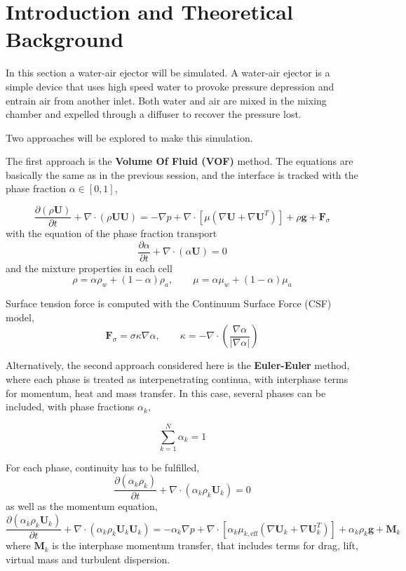\documentclass[
    parskip=half,      %
    DIV=12,            %
    headings=normal,   %
    fontsize=11pt,     %
    english            %
]{scrartcl}
\begin{document}
\section{Introduction and Theoretical Background}

In this section a water-air ejector will be simulated. A water-air ejector is a simple 
device that uses high speed water to provoke  pressure depression and entrain air from 
another inlet. Both water and air are mixed in the mixing chamber and expelled through a 
diffuser to recover the pressure lost.

Two approaches will be explored to make this simulation. 

The first approach is the \textbf{Volume Of Fluid (VOF)} method. The equations are basically the same
as in the previous session, and the interface is tracked with the phase fraction 
$\alpha \in [0,1]$,

\begin{equation}
\frac{\partial (\rho \mathbf{U})}{\partial t} + \nabla \cdot (\rho \mathbf{U} \mathbf{U}) = 
-\nabla p + \nabla \cdot \left[ \mu \left( \nabla \mathbf{U} + \nabla \mathbf{U}^T \right) \right] + \rho \mathbf{g} + \mathbf{F}_\sigma
\end{equation}  
with the equation of the phase fraction transport
\[
\frac{\partial \alpha}{\partial t} + \nabla \cdot (\alpha \mathbf{U}) = 0
\]
and the mixture properties in each cell
\[
\rho = \alpha \rho_w + (1-\alpha) \rho_a, \qquad 
\mu = \alpha \mu_w + (1-\alpha) \mu_a
\]

Surface tension force is computed with the Continuum Surface Force (CSF) model,
\[
\mathbf{F}_\sigma = \sigma \kappa \nabla \alpha, \qquad 
\kappa = -\nabla \cdot \left( \frac{\nabla \alpha}{|\nabla \alpha|} \right)
\]

Alternatively, the second approach considered here is the \textbf{Euler-Euler} method, where each phase 
is treated as interpenetrating continua, with interphase terms for momentum, heat and mass 
transfer. In this case, several phases can be included, with phase fractions $\alpha_k$, 

\[
\sum_{k=1}^{N} \alpha_k = 1
\]

For each phase, continuity has to be fulfilled,
\begin{equation}
	\frac{\partial (\alpha_k \rho_k)}{\partial t} + \nabla \cdot (\alpha_k \rho_k \mathbf{U}_k) = 0
\end{equation}
as well as the momentum equation,
\begin{equation}
\frac{\partial (\alpha_k \rho_k \mathbf{U}_k)}{\partial t} + \nabla \cdot (\alpha_k \rho_k \mathbf{U}_k \mathbf{U}_k) = 
-\alpha_k \nabla p + \nabla \cdot \left[ \alpha_k \mu_{k,\text{eff}} \left( \nabla \mathbf{U}_k + \nabla \mathbf{U}_k^T \right) \right] + \alpha_k \rho_k \mathbf{g} + \mathbf{M}_{k}
\end{equation}
where $\mathbf{M}_{k}$ is the interphase momentum transfer, that includes terms for drag, 
lift, virtual mass and turbulent dispersion.
\end{document}
